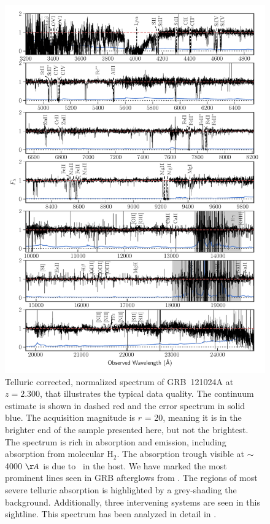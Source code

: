 \documentclass{aa}    %
\begin{document}
\begin{figure}
	\centerline{\includegraphics[width=0.85\linewidth]{figures/GRB121024A.pdf}}
\caption{Telluric corrected, normalized spectrum of GRB~121024A at $z = 2.300$,
	that illustrates the typical data quality. The continuum estimate is shown in
	dashed red and the error spectrum in solid blue. The acquisition magnitude is
	$r$ = 20, meaning it is in the brighter end of the sample presented here, but
	not the brightest. The spectrum is rich in absorption and emission, including
	absorption from molecular $\mathrm{H_2}$. The absorption trough visible at
	$\sim$ 4000 $\AA$ is due to \lya~in the host. We have marked the most prominent
	lines seen in GRB afterglows from \citet{Christensen2011a}. The regions of most
	severe telluric absorption is highlighted by a grey-shading the background.
	Additionally, three intervening systems are seen in this sightline. This
	spectrum has been analyzed in detail in \citet{Friis2015}.}
\label{fig:spectrum}
\end{figure}



\end{document}
